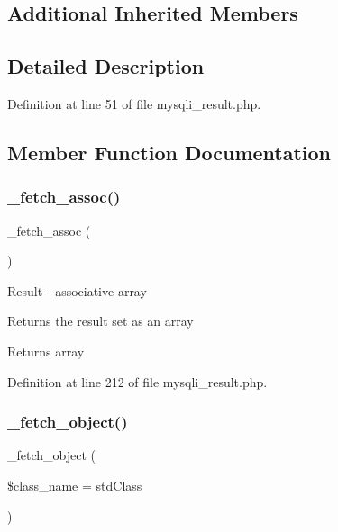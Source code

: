 \subsection*{Additional Inherited Members}


\subsection{Detailed Description}


Definition at line 51 of file mysqli\+\_\+result.\+php.



\subsection{Member Function Documentation}
\mbox{\label{class_c_i___d_b__mysqli__result_a43a9a92817f1334a1c10752ec44275a0}} 
\subsubsection{\texorpdfstring{\_fetch\_assoc()}{\_fetch\_assoc()}}
{\footnotesize\ttfamily \+\_\+fetch\+\_\+assoc (\begin{DoxyParamCaption}{ }\end{DoxyParamCaption})\hspace{0.3cm}{\ttfamily [protected]}}

Result -\/ associative array

Returns the result set as an array

\begin{DoxyReturn}{Returns}
array 
\end{DoxyReturn}


Definition at line 212 of file mysqli\+\_\+result.\+php.

\mbox{\label{class_c_i___d_b__mysqli__result_a60806be6a9c2488820813c2a7f4fef71}} 
\subsubsection{\texorpdfstring{\_fetch\_object()}{\_fetch\_object()}}
{\footnotesize\ttfamily \+\_\+fetch\+\_\+object (\begin{DoxyParamCaption}\item[{}]{\$class\+\_\+name = {\ttfamily \textquotesingle{}stdClass\textquotesingle{}} }\end{DoxyParamCaption})\hspace{0.3cm}{\ttfamily [protected]}}

